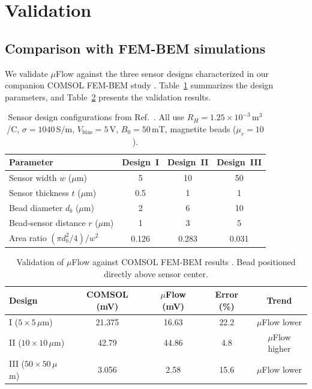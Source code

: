\documentclass[preprint,review,12pt]{elsarticle}
\begin{document}
\section{Validation}
\label{sec:validation}

\subsection{Comparison with FEM-BEM simulations}
\label{sec:femvalidation}

We validate $\mu$Flow against the three sensor designs characterized in our companion COMSOL FEM-BEM study \cite{govindaraju2025}. Table~\ref{tab:designs} summarizes the design parameters, and Table~\ref{tab:validation} presents the validation results.

\begin{table}[!htbp]
\caption{Sensor design configurations from Ref.~\cite{govindaraju2025}. All use $R_H = 1.25\times10^{-3}$\,m$^3$/C, $\sigma = 1040$\,S/m, $V_{\text{bias}} = 5$\,V, $B_0 = 50$\,mT, magnetite beads ($\mu_r = 10$).}
\label{tab:designs}
\centering
\footnotesize
\begin{tabular}{@{}lccc@{}}
\toprule
Parameter & Design~I & Design~II & Design~III \\
\midrule
Sensor width $w$ ($\mu$m) & 5 & 10 & 50 \\
Sensor thickness $t$ ($\mu$m) & 0.5 & 1 & 1 \\
Bead diameter $d_b$ ($\mu$m) & 2 & 6 & 10 \\
Bead-sensor distance $r$ ($\mu$m) & 1 & 3 & 5 \\
Area ratio $(\pi d_b^2/4)/w^2$ & 0.126 & 0.283 & 0.031 \\
\bottomrule
\end{tabular}
\end{table}

\begin{table}[!htbp]
\caption{Validation of $\mu$Flow against COMSOL FEM-BEM results \cite{govindaraju2025}. Bead positioned directly above sensor center.}
\label{tab:validation}
\centering
\footnotesize
\begin{tabular}{@{}lcccc@{}}
\toprule
Design & COMSOL (mV) & $\mu$Flow (mV) & Error (\%) & Trend \\
\midrule
I ($5\times5$\,$\mu$m) & 21.375 & 16.63 & 22.2 & $\mu$Flow lower \\
II ($10\times10$\,$\mu$m) & 42.79 & 44.86 & 4.8 & $\mu$Flow higher \\
III ($50\times50$\,$\mu$m) & 3.056 & 2.58 & 15.6 & $\mu$Flow lower \\
\bottomrule
\end{tabular}
\end{table}
\end{document}
